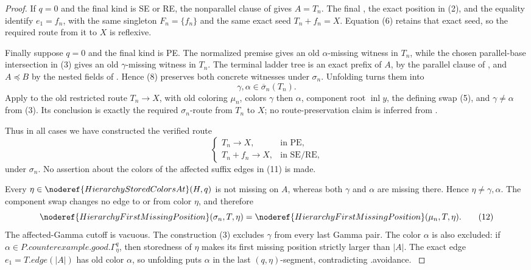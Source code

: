 \begin{proof}
If \(q=0\) and the final kind is SE or RE, the nonparallel clause of
 gives \(A=T_n\).  The final
, the exact position in (2), and the
 equality identify \(e_1=f_n\), with the
same singleton \(F_n=\{f_n\}\) and the same exact seed
\(T_n+f_n=X\).  Equation (6) retains that exact seed, so the required
route from it to \(X\) is reflexive.

Finally suppose \(q=0\) and the final kind is PE.  The normalized premise
gives an old \(\alpha\)-missing witness in \(T_n\), while the chosen
parallel-base intersection in (3) gives an old \(\gamma\)-missing witness
in \(T_n\).  The terminal ladder tree is an exact prefix of \(A\), by the
parallel clause of , and \(A\preccurlyeq B\) by
the nested fields of .  Hence (8) preserves
both concrete witnesses under \(\sigma_n\).  Unfolding
 turns them into
\[
 \gamma,\alpha\in\overline\sigma_n(T_n).
\]
Apply  to the old
restricted route \(T_n\longrightarrow X\), with old coloring \(\mu_n\),
colors \(\gamma\) then \(\alpha\), component root
\(\operatorname{inl}y\), the defining swap (5), and
\(\gamma\ne\alpha\) from (3).  Its conclusion is exactly the required
\(\sigma_n\)-route from \(T_n\) to \(X\); no route-preservation claim is
inferred from .

Thus in all cases we have constructed the verified route
\[
\begin{cases}
T_n\longrightarrow X,&\text{in PE},\\
T_n+f_n\longrightarrow X,&\text{in SE/RE},
\end{cases}                                                   \tag{10}
\]
under \(\sigma_n\).
No assertion about the colors of the affected suffix edges in (11) is
made.

Every \(\eta\in\noderef{HierarchyStoredColorsAt}(H,q)\) is not missing on
\(A\), whereas both \(\gamma\) and \(\alpha\) are missing there.  Hence
\(\eta\ne\gamma,\alpha\).  The component swap changes no edge to or from
color \(\eta\), and therefore
\[
 \noderef{HierarchyFirstMissingPosition}(\sigma_n,T,\eta)
 =\noderef{HierarchyFirstMissingPosition}(\mu_n,T,\eta).     \tag{12}
\]
The affected-Gamma cutoff is vacuous.  The construction (3) excludes
\(\gamma\) from every last Gamma pair.  The color \(\alpha\) is also
excluded: if \(\alpha\in
P.\mathit{counterexample}.\mathit{good}.\Gamma^q_\eta\), then storedness
of \(\eta\) makes its first missing position strictly larger than
\(|A|\).  The exact edge \(e_1=T.\mathit{edge}(|A|)\) has old color
\(\alpha\), so unfolding  puts
\(\alpha\) in the last \((q,\eta)\)-segment, contradicting
.avoidance.                            \(\tag{13}\)


\end{proof}
